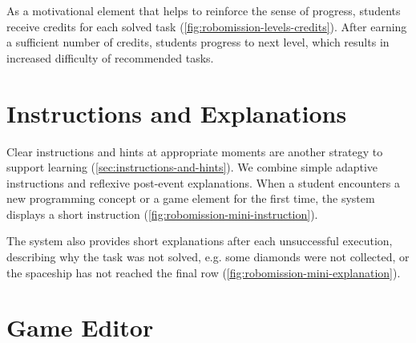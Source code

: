 
As a motivational element that helps to reinforce the sense of progress,
students receive credits for each solved task
(\cref{fig:robomission-levels-credits}).
After earning a sufficient number of credits, students progress to next level,
which results in increased difficulty of recommended tasks.



\section{Instructions and Explanations}
\label{sec:game.explanations}

Clear instructions and hints at appropriate moments
are another strategy to support learning
(\cref{sec:instructions-and-hints}).
We combine simple adaptive instructions and reflexive post-event explanations.
When a student encounters a new programming concept or a game element
for the first time, the system displays a short instruction
(\cref{fig:robomission-mini-instruction}).


The system also provides short explanations after each unsuccessful execution,
describing why the task was not solved,
e.g. some diamonds were not collected,
or the spaceship has not reached the final row
(\cref{fig:robomission-mini-explanation}).


\section{Game Editor}  %
\label{sec:robomission.task-editor}

